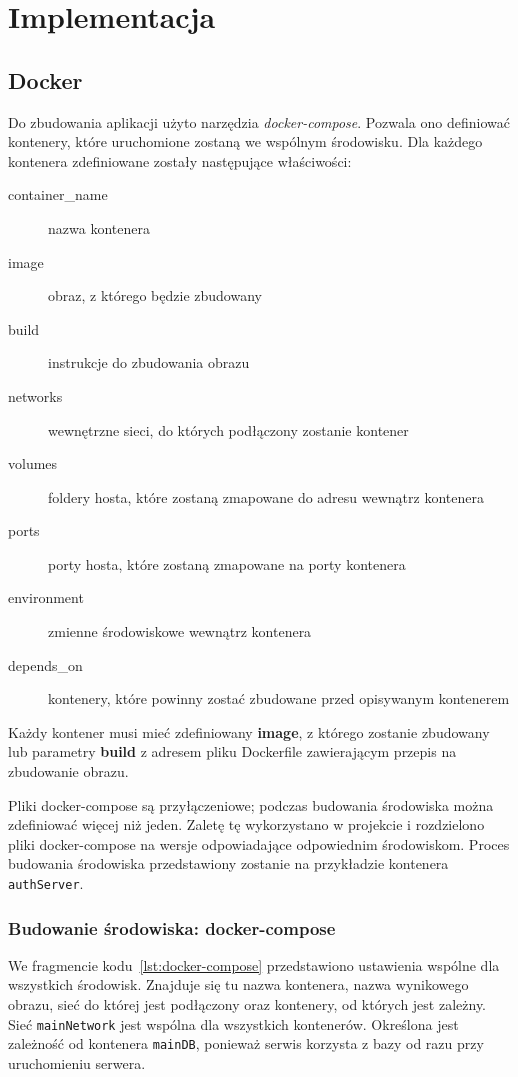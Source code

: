 \chapter{Implementacja}
\label{sec:implementacja}

\section{Docker}
	Do zbudowania aplikacji użyto narzędzia \emph{docker-compose}.
	Pozwala ono definiować kontenery, które uruchomione zostaną we wspólnym środowisku.
	Dla każdego kontenera zdefiniowane zostały następujące właściwości:
	\begin{description}
		\item[container\_name] nazwa kontenera
		\item[image] obraz, z którego będzie zbudowany
		\item[build] instrukcje do zbudowania obrazu
		\item[networks] wewnętrzne sieci, do których podłączony zostanie kontener
		\item[volumes] foldery hosta, które zostaną zmapowane do adresu wewnątrz kontenera
		\item[ports] porty hosta, które zostaną zmapowane na porty kontenera
		\item[environment] zmienne środowiskowe wewnątrz kontenera
		\item[depends\_on] kontenery, które powinny zostać zbudowane przed opisywanym kontenerem
	\end{description}
	Każdy kontener musi mieć zdefiniowany \textbf{image}, z którego zostanie zbudowany
	lub parametry \textbf{build} z adresem pliku Dockerfile zawierającym przepis na zbudowanie obrazu.
	
	Pliki docker-compose są przyłączeniowe; podczas budowania środowiska można zdefiniować więcej niż jeden.
	Zaletę tę wykorzystano w projekcie i rozdzielono pliki docker-compose na wersje odpowiadające odpowiednim środowiskom.
	Proces budowania środowiska przedstawiony zostanie na przykładzie kontenera \verb|authServer|.

	\subsection{Budowanie środowiska: docker-compose}
		We fragmencie kodu~\ref{lst:docker-compose} przedstawiono ustawienia wspólne dla wszystkich środowisk.
		Znajduje się tu nazwa kontenera, nazwa wynikowego obrazu, sieć do której jest podłączony oraz kontenery, od których jest zależny.
		Sieć \verb|mainNetwork| jest wspólna dla wszystkich kontenerów.
		Określona jest zależność od kontenera \verb|mainDB|, ponieważ serwis korzysta z bazy od razu przy uruchomieniu serwera.

